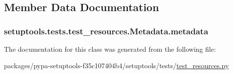 \subsection{Member Data Documentation}
\hypertarget{classsetuptools_1_1tests_1_1test__resources_1_1Metadata_a56f2ca4d2bfdc6cb8a7fe20514fe2402}{}
\subsubsection[{metadata}]{\setlength{\rightskip}{0pt plus 5cm}setuptools.\+tests.\+test\+\_\+resources.\+Metadata.\+metadata}\label{classsetuptools_1_1tests_1_1test__resources_1_1Metadata_a56f2ca4d2bfdc6cb8a7fe20514fe2402}


The documentation for this class was generated from the following file\+:\begin{DoxyCompactItemize}
\item 
packages/pypa-\/setuptools-\/f35c107404b4/setuptools/tests/\hyperlink{test__resources_8py}{test\+\_\+resources.\+py}\end{DoxyCompactItemize}
